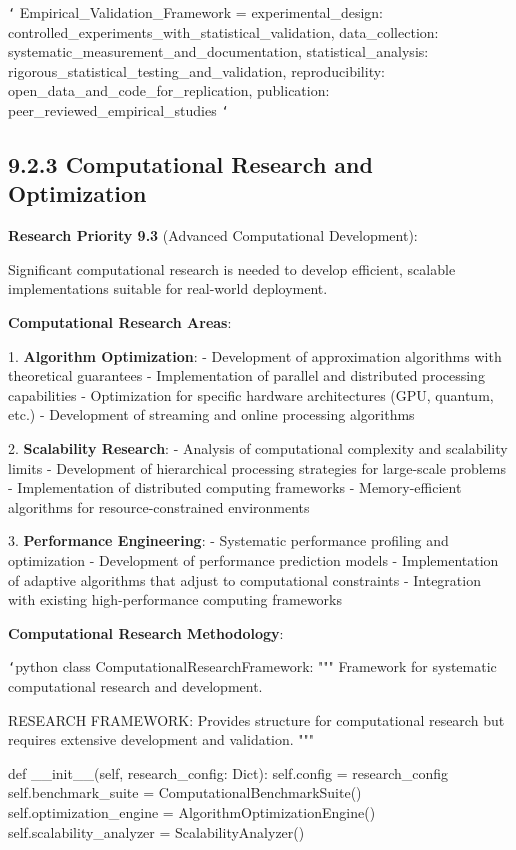 \texttt{`}
Empirical_Validation_Framework = {
    experimental_design: controlled_experiments_with_statistical_validation,
    data_collection: systematic_measurement_and_documentation,
    statistical_analysis: rigorous_statistical_testing_and_validation,
    reproducibility: open_data_and_code_for_replication,
    publication: peer_reviewed_empirical_studies
}
\texttt{`}

\subsection{9.2.3 Computational Research and Optimization}

\textbf{Research Priority 9.3} (Advanced Computational Development):

Significant computational research is needed to develop efficient, scalable implementations suitable for real-world deployment.

\textbf{Computational Research Areas}:

1. \textbf{Algorithm Optimization}:
   - Development of approximation algorithms with theoretical guarantees
   - Implementation of parallel and distributed processing capabilities
   - Optimization for specific hardware architectures (GPU, quantum, etc.)
   - Development of streaming and online processing algorithms

2. \textbf{Scalability Research}:
   - Analysis of computational complexity and scalability limits
   - Development of hierarchical processing strategies for large-scale problems
   - Implementation of distributed computing frameworks
   - Memory-efficient algorithms for resource-constrained environments

3. \textbf{Performance Engineering}:
   - Systematic performance profiling and optimization
   - Development of performance prediction models
   - Implementation of adaptive algorithms that adjust to computational constraints
   - Integration with existing high-performance computing frameworks

\textbf{Computational Research Methodology}:

\texttt{`}python
class ComputationalResearchFramework:
    """
    Framework for systematic computational research and development.
    
    RESEARCH FRAMEWORK: Provides structure for computational research
    but requires extensive development and validation.
    """
    
    def __init__(self, research_config: Dict):
        self.config = research_config
        self.benchmark_suite = ComputationalBenchmarkSuite()
        self.optimization_engine = AlgorithmOptimizationEngine()
        self.scalability_analyzer = ScalabilityAnalyzer()
        
